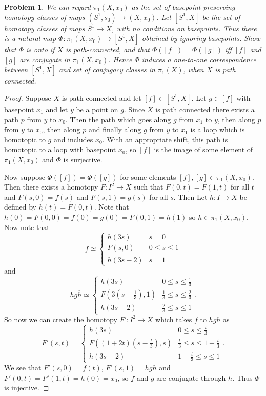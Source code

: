 \documentclass{article}
\newtheorem{problem}{Problem}
\begin{document}
\begin{problem}
\label{phi}
We can regard $\pi_1(X,x_0)$ as the set of basepoint-preserving homotopy classes of maps $(S^1,s_0) \to (X,x_0)$. Let $[S^1,X]$ be the set of homotopy classes of maps $S^1 \to X$, with no conditions on basepoints. Thus there is a natural map $\Phi : \pi_1(X,x_0) \to [S^1,X]$ obtained by ignoring basepoints. Show that $\Phi$ is onto if $X$ is path-connected, and that $\Phi([f]) = \Phi([g])$ iff $[f]$ and $[g]$ are conjugate in $\pi_1(X,x_0)$. Hence $\Phi$ induces a one-to-one correspondence between $[S^1,X]$ and set of conjugacy classes in $\pi_1(X)$, when $X$ is path connected.
\end{problem}
\begin{proof}
Suppose $X$ is path connected and let $[f] \in [S^1,X]$. Let $g \in [f]$ with basepoint $x_1$ and let $y$ be a point on $g$. Since $X$ is path connected there exists a path $p$ from $y$ to $x_0$. Then the path which goes along $g$ from $x_1$ to $y$, then along $p$ from $y$ to $x_0$, then along $\overline{p}$ and finally along $g$ from $y$ to $x_1$ is a loop which is homotopic to $g$ and includes $x_0$. With an appropriate shift, this path is homotopic to a loop with basepoint $x_0$, so $[f]$ is the image of some element of $\pi_1(X,x_0)$ and $\Phi$ is surjective.
\vspace{100pt}

Now suppose $\Phi([f]) = \Phi([g])$ for some elements $[f],[g] \in \pi_1(X,x_0)$. Then there exists a homotopy $F : I^2 \to X$ such that $F(0,t) = F(1,t)$ for all $t$ and $F(s,0) = f(s)$ and $F(s,1) = g(s)$ for all $s$. Then Let $h : I \to X$ be defined by $h(t) = F(0,t)$. Note that $h(0) = F(0,0) = f(0) = g(0) = F(0,1) = h(1)$ so $h \in \pi_1(X,x_0)$.
\vspace{100pt}
Now note that
\[
f \simeq
\begin{cases}
h(3s) & s = 0\\
F(s,0) & 0 \leq s \leq 1\\
\overline{h}(3s-2) & s = 1
\end{cases}
\]
and
\[
hg\overline{h} \simeq
\begin{cases}
h(3s) & 0 \leq s \leq \frac{1}{3}\\
F\left (3 \left (s-\frac{1}{3} \right ),1 \right) & \frac{1}{3} \leq s \leq \frac{2}{3}\\
\overline{h}(3s-2) & \frac{2}{3} \leq s \leq 1
\end{cases}.
\]
So now we can create the homotopy $F' : I^2 \to X$ which takes $f$ to $hg\overline{h}$ as
\[
F'(s,t) =
\begin{cases}
h(3s) & 0 \leq s \leq \frac{t}{3}\\
F \left ((1+2t) \left (s-\frac{t}{3} \right ),s \right ) & \frac{t}{3} \leq s \leq 1 - \frac{t}{3}\\
\overline{h}(3s-2) & 1 - \frac{t}{3} \leq s \leq 1
\end{cases}.
\]
We see that $F'(s,0) = f(t)$, $F'(s,1) = hg\overline{h}$ and $F'(0,t) = F'(1,t) = h(0) = x_0$, so $f$ and $g$ are conjugate through $h$. Thus $\Phi$ is injective.
\end{proof}
\end{document}
